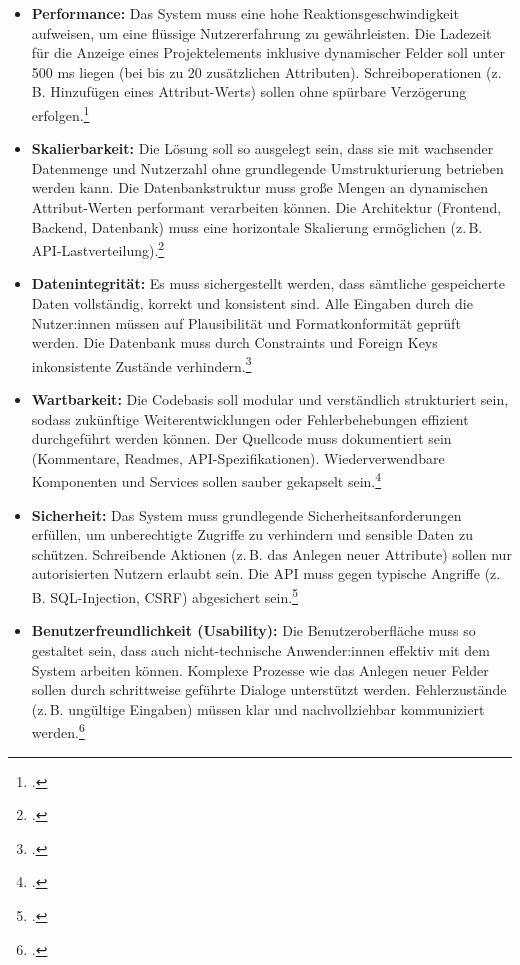 \begin{itemize}
  \item \textbf{Performance:}  
  Das System muss eine hohe Reaktionsgeschwindigkeit aufweisen, um eine flüssige Nutzererfahrung zu gewährleisten.  
  Die Ladezeit für die Anzeige eines Projektelements inklusive dynamischer Felder soll unter 500 ms liegen (bei bis zu 20 zusätzlichen Attributen).  
  Schreiboperationen (z.\,B. Hinzufügen eines Attribut-Werts) sollen ohne spürbare Verzögerung erfolgen.\footcite[Vgl.][]{Galletta2006}

  \item \textbf{Skalierbarkeit:}  
  Die Lösung soll so ausgelegt sein, dass sie mit wachsender Datenmenge und Nutzerzahl ohne grundlegende Umstrukturierung betrieben werden kann.  
  Die Datenbankstruktur muss große Mengen an dynamischen Attribut-Werten performant verarbeiten können.  
  Die Architektur (Frontend, Backend, Datenbank) muss eine horizontale Skalierung ermöglichen (z.\,B. API-Lastverteilung).\footcite[Vgl.][]{Leavitt2010}

  \item \textbf{Datenintegrität:}  
  Es muss sichergestellt werden, dass sämtliche gespeicherte Daten vollständig, korrekt und konsistent sind.  
  Alle Eingaben durch die Nutzer:innen müssen auf Plausibilität und Formatkonformität geprüft werden.  
  Die Datenbank muss durch Constraints und Foreign Keys inkonsistente Zustände verhindern.\footcite[Vgl.][]{Date2003}

  \item \textbf{Wartbarkeit:}  
  Die Codebasis soll modular und verständlich strukturiert sein, sodass zukünftige Weiterentwicklungen oder Fehlerbehebungen effizient durchgeführt werden können.  
  Der Quellcode muss dokumentiert sein (Kommentare, Readmes, API-Spezifikationen).  
  Wiederverwendbare Komponenten und Services sollen sauber gekapselt sein.\footcite[Vgl.][]{Parnas1972}

  \item \textbf{Sicherheit:}  
  Das System muss grundlegende Sicherheitsanforderungen erfüllen, um unberechtigte Zugriffe zu verhindern und sensible Daten zu schützen.  
  Schreibende Aktionen (z.\,B. das Anlegen neuer Attribute) sollen nur autorisierten Nutzern erlaubt sein.  
  Die API muss gegen typische Angriffe (z.\,B. SQL-Injection, CSRF) abgesichert sein.\footcite[Vgl.][]{OWASP2017}

  \item \textbf{Benutzerfreundlichkeit (Usability):}  
  Die Benutzeroberfläche muss so gestaltet sein, dass auch nicht-technische Anwender:innen effektiv mit dem System arbeiten können.  
  Komplexe Prozesse wie das Anlegen neuer Felder sollen durch schrittweise geführte Dialoge unterstützt werden.  
  Fehlerzustände (z.\,B. ungültige Eingaben) müssen klar und nachvollziehbar kommuniziert werden.\footcite[Vgl.][]{Nielsen2016}
\end{itemize}

